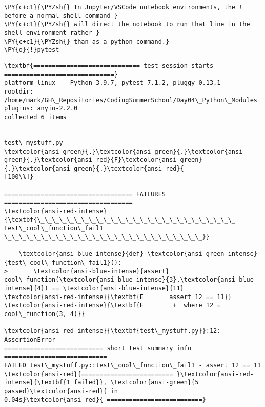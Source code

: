     \begin{tcolorbox}[breakable, size=fbox, boxrule=1pt, pad at break*=1mm,colback=cellbackground, colframe=cellborder]
\begin{Verbatim}[commandchars=\\\{\}]
\PY{c+c1}{\PYZsh{} In Jupyter/VSCode notebook environments, the ! before a normal shell command }
\PY{c+c1}{\PYZsh{} will direct the notebook to run that line in the shell environment rather }
\PY{c+c1}{\PYZsh{} than as a python command.}
\PY{o}{!}pytest 
\end{Verbatim}
\end{tcolorbox}

    \begin{Verbatim}[commandchars=\\\{\}]
\textbf{============================= test session starts
==============================}
platform linux -- Python 3.9.7, pytest-7.1.2, pluggy-0.13.1
rootdir: /home/mark/GH\_Repositories/CodingSummerSchool/Day04\_Python\_Modules
plugins: anyio-2.2.0
collected 6 items


test\_mystuff.py
\textcolor{ansi-green}{.}\textcolor{ansi-green}{.}\textcolor{ansi-green}{.}\textcolor{ansi-red}{F}\textcolor{ansi-green}{.}\textcolor{ansi-green}{.}\textcolor{ansi-red}{
[100\%]}

=================================== FAILURES ===================================
\textcolor{ansi-red-intense}{\textbf{\_\_\_\_\_\_\_\_\_\_\_\_\_\_\_\_\_\_\_\_\_\_\_\_\_\_\_ test\_cool\_function\_fail1
\_\_\_\_\_\_\_\_\_\_\_\_\_\_\_\_\_\_\_\_\_\_\_\_\_\_\_}}

    \textcolor{ansi-blue-intense}{def} \textcolor{ansi-green-intense}{test\_cool\_function\_fail1}():
>       \textcolor{ansi-blue-intense}{assert}
cool\_function(\textcolor{ansi-blue-intense}{3},\textcolor{ansi-blue-intense}{4}) == \textcolor{ansi-blue-intense}{11}
\textcolor{ansi-red-intense}{\textbf{E       assert 12 == 11}}
\textcolor{ansi-red-intense}{\textbf{E        +  where 12 = cool\_function(3, 4)}}

\textcolor{ansi-red-intense}{\textbf{test\_mystuff.py}}:12: AssertionError
=========================== short test summary info ============================
FAILED test\_mystuff.py::test\_cool\_function\_fail1 - assert 12 == 11
\textcolor{ansi-red}{========================= }\textcolor{ansi-red-intense}{\textbf{1 failed}}, \textcolor{ansi-green}{5 passed}\textcolor{ansi-red}{ in
0.04s}\textcolor{ansi-red}{ ==========================}
    \end{Verbatim}

